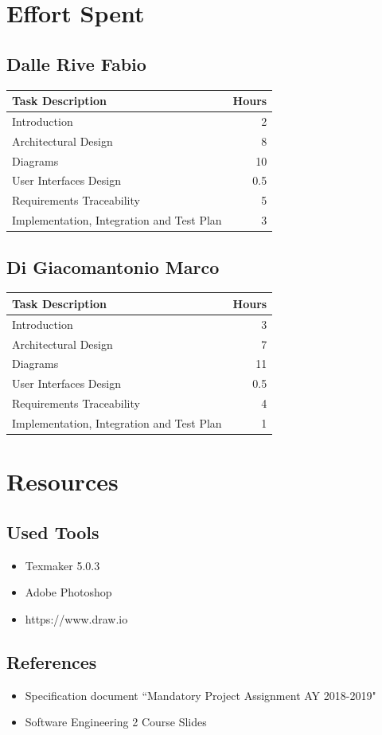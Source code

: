 \documentclass{article}
\begin{document}
\section{Effort Spent}
\subsection{Dalle Rive Fabio}
\begin{center}
    \begin{tabular}{ | l | r |}
    \hline
    \textbf{Task Description} & \textbf{Hours} \\ \hline
    Introduction & 2\\ \hline
   	Architectural Design & 8\\ \hline
   	Diagrams & 10\\ \hline
    User Interfaces Design & 0.5\\ \hline
    Requirements Traceability & 5\\ \hline
    Implementation, Integration and Test Plan & 3\\ \hline
    \end{tabular}
\end{center}
\subsection{Di Giacomantonio Marco}
\begin{center}
    \begin{tabular}{ | l | r |}
    \hline
    \textbf{Task Description} & \textbf{Hours} \\ \hline
    Introduction & 3\\ \hline
   	Architectural Design & 7\\ \hline
   	Diagrams & 11\\ \hline
    User Interfaces Design & 0.5\\ \hline
    Requirements Traceability & 4\\ \hline
    Implementation, Integration and Test Plan & 1\\ \hline
    \end{tabular}
\end{center}
\newpage
\section{Resources}
\subsection{Used Tools}
\begin{itemize}
\item Texmaker 5.0.3
\item Adobe Photoshop
\item https://www.draw.io
\end{itemize}
\subsection{References}
\begin{itemize}
\item Specification document “Mandatory Project Assignment AY 2018-2019"
\item Software Engineering 2 Course Slides
\end{itemize}
\newpage
\end{document}

